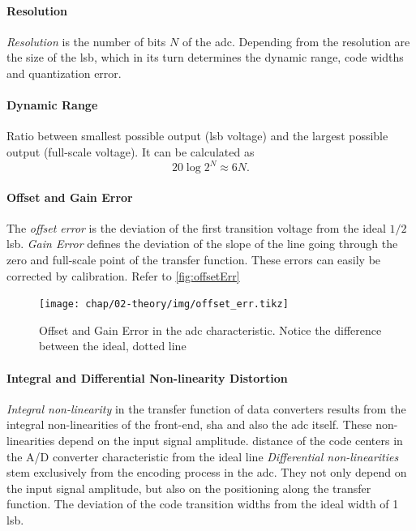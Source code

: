 \paragraph{Resolution}
\textit{Resolution} is the number of bits $N$ of the \gls{adc}. Depending from the resolution are the size of the \gls{lsb}, which in its turn determines the dynamic range, code widths and quantization error.

\paragraph{Dynamic Range}
Ratio between smallest possible output (\gls{lsb} voltage) and the largest possible output (full-scale voltage). It can be calculated as
\begin{equation}
	20 \log 2^{N} \approx 6N.
\end{equation}


\paragraph{Offset and Gain Error}
The \textit{offset error} is the deviation of the first transition voltage from the ideal $1/2$ \gls{lsb}. \textit{Gain Error} defines the deviation of the slope of the line going through the zero and full-scale point of the transfer function. These errors can easily be corrected by calibration. Refer to \autoref{fig:offsetErr}

\begin{figure}[H]
	\centering
	\texttt{[image: chap/02-theory/img/offset\_err.tikz]}
	\caption{Offset and Gain Error in the \gls{adc} characteristic. Notice the difference between the ideal, dotted line}
	\label{fig:offsetErr}
\end{figure}


\paragraph{Integral and Differential Non-linearity Distortion} 
\textit{Integral non-linearity} in the transfer function of data converters results from the integral non-linearities of the front-end, \gls{sha} and also the \gls{adc} itself.
These non-linearities depend on the input signal amplitude.
distance of the code centers in the A/D converter characteristic from the ideal line
\textit{Differential non-linearities} stem exclusively from the encoding process in the \gls{adc}.
They not only depend on the input signal amplitude, but also on the positioning along the transfer function.
The deviation of the code transition widths from the ideal width
of 1 \gls{lsb}.

